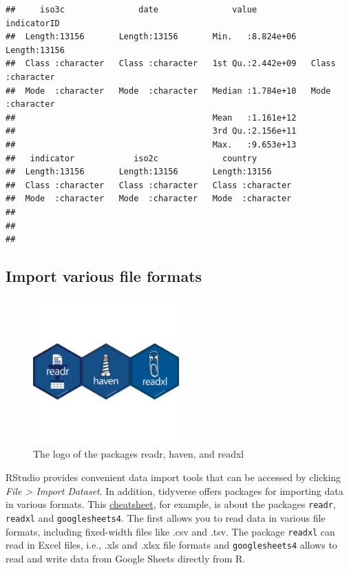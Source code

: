 \documentclass[
  12pt,
  oneside]{book}
\theoremstyle{definition}
\theoremstyle{definition}
\theoremstyle{definition}
\theoremstyle{definition}
\theoremstyle{remark}
\begin{document}
\begin{verbatim}
##     iso3c               date               value           indicatorID       
##  Length:13156       Length:13156       Min.   :8.824e+06   Length:13156      
##  Class :character   Class :character   1st Qu.:2.442e+09   Class :character  
##  Mode  :character   Mode  :character   Median :1.784e+10   Mode  :character  
##                                        Mean   :1.161e+12                     
##                                        3rd Qu.:2.156e+11                     
##                                        Max.   :9.653e+13                     
##   indicator            iso2c             country         
##  Length:13156       Length:13156       Length:13156      
##  Class :character   Class :character   Class :character  
##  Mode  :character   Mode  :character   Mode  :character  
##                                                          
##                                                          
## 
\end{verbatim}

\hypertarget{import-various-file-formats}{%
\subsection{Import various file formats}\label{import-various-file-formats}}

\begin{figure}
\centering
\includegraphics[width=0.5\textwidth,height=\textheight]{fig/import-logo.png}
\caption{\label{fig:import-logo} The logo of the packages readr, haven, and readxl}
\end{figure}

RStudio provides convenient data import tools that can be accessed by clicking \emph{File \textgreater{} Import Dataset}. In addition, tidyverse offers packages for importing data in various formats. This \href{https://posit.co/wp-content/uploads/2022/10/data-import.pdf}{cheatsheet}, for example, is about the packages \texttt{readr}, \texttt{readxl} and \texttt{googlesheets4}. The first allows you to read data in various file formats, including fixed-width files like .csv and .tsv. The package \texttt{readxl} can read in Excel files, i.e., .xls and .xlsx file formats and \texttt{googlesheets4} allows to read and write data from Google Sheets directly from R.
\end{document}
